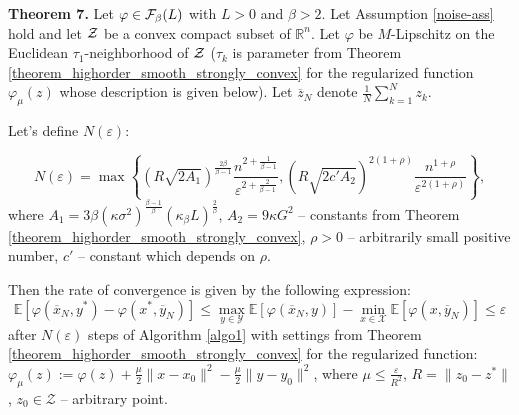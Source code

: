 \documentclass[runningheads]{llncs}
\def \R {\mathbb R}
\def\R{\mathbb{R}}
\newcommand{\E}{{\mathbb E}}
\def\R{\mathbb R}
\def\E{\mathbb E}
\begin{document}
\textbf{Theorem 7.}
Let $\varphi \in {\cal F}_{\beta}(L)$ with $L > 0$ and $\beta > 2$. 
Let Assumption \ref{noise-ass} hold 
and let $\cal{Z}$ be a convex compact subset of $\R^n$.
Let $\varphi$ be $M$-Lipschitz on the Euclidean $\tau_1$-neighborhood of $\cal{Z}$ ($\tau_k$ is parameter from Theorem \ref{theorem_highorder_smooth_strongly_convex} for the regularized function $\varphi_\mu(z)$ whose  description is given below). Let $\overline{z}_N$ denote $\frac{1}{N}\sum\limits_{k=1}^N z_k$.

Let's define $N(\varepsilon)$:

\begin{equation*}
    N(\varepsilon)=\max\left\{ \left(R\sqrt{2A_1}\right)^{\frac{2\beta}{\beta-1}}\dfrac{n^{2+\frac{1}{\beta-1}}}{\varepsilon^{2+\frac{2}{\beta-1}}},\left(R\sqrt{2c'A_2}\right)^{2(1+\rho)}\dfrac{n^{1+\rho}}{\varepsilon^{2(1+\rho)}}\right\},
\end{equation*}
where  $A_1=3\beta(\kappa \sigma^2)^{\frac{\beta-1}{\beta}}(\kappa_{\beta}L)^{\frac{2}{\beta}}$, $A_2=9\kappa G^2$ -- constants from Theorem \ref{theorem_highorder_smooth_strongly_convex}, $\rho > 0$ -- arbitrarily small positive number, $c'$ -- constant which depends on $\rho$. 

Then the rate of convergence is given by the following expression:
\begin{equation}\label{error_less_than_eps}
    \E \left[ \varphi(\overline{x}_N, y^*) - \varphi(x^*, \overline{y}_N) \right] \leq \max_{y\in \mathcal{Y}} \E \left[\varphi(\overline{x}_N, y)  \right] -
    \min_{x\in \mathcal{X}}\E \left[\varphi(x, \overline{y}_N) \right] \leq \varepsilon
\end{equation}
after $N(\varepsilon)$ steps of Algorithm \ref{algo1} with settings from Theorem \ref{theorem_highorder_smooth_strongly_convex} for the regularized function: $\varphi_{\mu}(z):=\varphi(z)+\frac{\mu}{2} \| x-x_0 \|^2-\frac{\mu}{2} \| y - y_0 \|^2$, where $\mu \leq \frac{\varepsilon}{R^2}$, $R=\|z_0-z^*\|$, $z_0 \in \mathcal{Z}$ -- arbitrary point.
\end{document}
